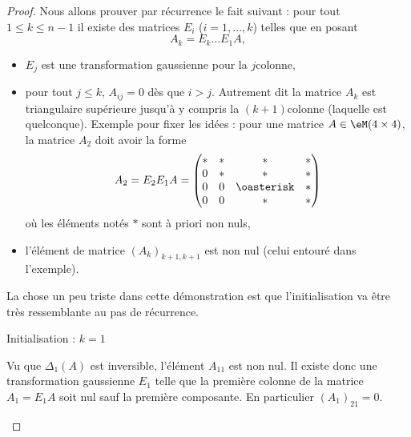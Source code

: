 \begin{proof}
    Nous allons prouver par récurrence le fait suivant : pour tout \( 1\leq k\leq n-1\) il existe des matrices \( E_i\) ($i=1,\ldots, k$) telles que en posant
    \begin{equation}
        A_k=E_{k}\ldots E_1A,
    \end{equation}
    \begin{itemize}
        \item \( E_j\) est une transformation gaussienne pour la \( j\)\ieme colonne,
        \item pour tout \( j\leq k\), \( A_{ij}=0\) dès que \( i>j\). Autrement dit la matrice \( A_k\) est triangulaire supérieure jusqu'à y compris la \( (k+1)\)\ieme colonne (laquelle est quelconque). Exemple pour fixer les idées : pour une matrice \( A\in \eM(4\times 4) \), la matrice \( A_2\) doit avoir la forme
            \begin{equation}
                A_2=E_2E_1A=\begin{pmatrix}
                     *   &   *    &   *    &   *    \\
                     0   &   *    &   *    &   *    \\
                     0   &   0    &   \oasterisk    &   *    \\
                     0   &   0    &   *    &   *
                 \end{pmatrix}
            \end{equation}
            où les éléments notés \(*\) sont à priori non nuls,
        \item l'élément de matrice \( (A_k)_{ k+1,k+1  }  \) est non nul (celui entouré dans l'exemple).
    \end{itemize}

    La chose un peu triste dans cette démonstration est que l'initialisation va être très ressemblante au pas de récurrence.
    \begin{subproof}
        \item[Initialisation : \( k=1\)]

            Vu que \( \Delta_1(A)\) est inversible, l'élément \( A_{11}\) est non nul. Il existe donc une transformation gaussienne \( E_1\) telle que la première colonne de la matrice \( A_1=E_1A\) soit nul sauf la première composante. En particulier \( (A_1)_{21}=0\).


\end{subproof}
\end{proof}
